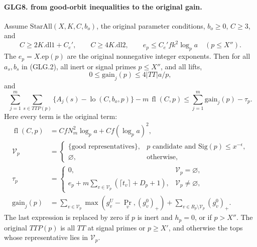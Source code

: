 \documentclass[11pt,a4paper]{article}
\numberwithin{equation}{section}
\theoremstyle{remark}\newtheorem{remark}[theorem]{Remark}
\begin{document}
\paragraph{GLG8. from good-orbit inequalities to the original gain.}
\label{claim:GLG8}
Assume \(\mathrm{StarAll}(X,K,C,b_o)\), the original parameter
conditions, \(b_o\ge0\), \(C\ge3\), and
\[
 C\ge2K.\mathrm{dl1}+C_e',\qquad C\ge4K.\mathrm{dl2},\qquad
 e_p\le C_e'f k^2\log_pa\quad(p\le X'').                           \tag{GLG.27}
\]
The \(e_p=X.\mathrm{ep}(p)\) are the original nonnegative
integer exponents. Then for all \(a_s,b_s\) in (GLG.2), all
inert or signal primes \(p\le X''\), and all lifts,
\[
 0\le\mathrm{gain}_j(p)\le4|TT|a/p,                               \tag{GLG.28}
\]
and
\[
 \sum_{j=1}^m\sum_{s\in TTP(p)}
                 \{A_j(s)-\operatorname{lo}(C,b_o,p)\}
       -m\,\operatorname{fl}(C,p)
        \le\sum_{j=1}^m\mathrm{gain}_j(p)-\tau_p .                 \tag{GLG.29}
\]
Here every term is the original term:
\[
 \begin{split}
 \operatorname{fl}(C,p)&=CfN_m^2\log_pa+Cf(\log_pa)^2,\\
 \mathcal V_p&=\begin{cases}
      \{\text{good representatives}\},&
      p\text{ candidate and }\mathrm{Sig}(p)\le x^{-\epsilon},\\
      \varnothing,&\text{otherwise},
      \end{cases}\\
 \tau_p&=\begin{cases}
      0,&\mathcal V_p=\varnothing,\\
      e_p+m\sum_{v\in\mathcal V_p}(\lceil t_v\rceil+D_p+1),
                                  &\mathcal V_p\ne\varnothing,
      \end{cases}\\
 \mathrm{gain}_j(p)&=
      \sum_{v\in\mathcal V_p}\max(g_v^U-\Pr_v,(g_v^0)_+)
      +\sum_{v\in R_p\setminus\mathcal V_p}(g_v^0)_+ .
 \end{split}                                                       \tag{GLG.30}
\]
The last expression is replaced by zero if \(p\) is inert
and \(h_p=0\), or if \(p>X''\). The original \(TTP(p)\)
is all \(TT\) at signal primes or \(p\ge X'\), and otherwise
the tops whose representative lies in \(\mathcal V_p\).
\end{document}

